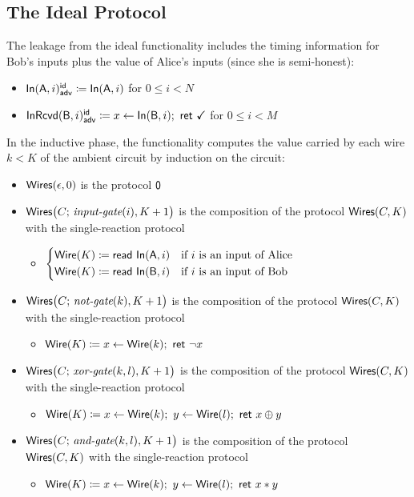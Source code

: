 \subsection{The Ideal Protocol}
The leakage from the ideal functionality includes the timing information for Bob's inputs plus the value of Alice's inputs (since she is semi-honest):
\begin{itemize}
\item {\color{blue} $\mathsf{In}(\mathsf{A},i)^{\mathsf{id}}_{\mathsf{adv}} \coloneqq \mathsf{In}(\mathsf{A},i)$ for $0 \leq i < N$}
\item {\color{blue} $\mathsf{InRcvd}(\mathsf{B},i)^{\mathsf{id}}_{\mathsf{adv}} \coloneqq x\leftarrow \mathsf{In}(\mathsf{B},i); \ \mathsf{ret} \ \checkmark$ for $0 \leq i < M$}
\end{itemize}

\noindent In the inductive phase, the functionality computes the value carried by each wire $k < K$ of the ambient circuit by induction on the circuit:

\begin{itemize}
\item $\mathsf{Wires}(\epsilon,0)$ is the protocol $\mathsf{0}$
\item $\mathsf{Wires}\big(C; \, \textit{input-gate}(i),K+1\big)$ is the composition of the protocol $\mathsf{Wires}(C,K)$ with the single-reaction protocol
\begin{itemize}
\item $\begin{cases*} \Wire(K) \coloneqq \read{\In(\A,i)} & \text{if $i$ is an input of Alice} \\ \Wire(K) \coloneqq \read{\In(\B,i)} & \text{if $i$ is an input of Bob} \end{cases*}$
\end{itemize}
\item $\mathsf{Wires}\big(C; \, \textit{not-gate}(k),K+1\big)$ is the composition of the protocol $\mathsf{Wires}(C,K)$ with the single-reaction protocol
\begin{itemize}
\item $\mathsf{Wire}(K) \coloneqq x \leftarrow \mathsf{Wire}(k); \ \mathsf{ret} \ \neg x$
\end{itemize}
\item $\mathsf{Wires}\big(C; \, \textit{xor-gate}(k,l),K+1\big)$ is the composition of the protocol $\mathsf{Wires}(C,K)$ with the single-reaction protocol
\begin{itemize}
\item $\mathsf{Wire}(K) \coloneqq x \leftarrow \mathsf{Wire}(k); \ y \leftarrow \mathsf{Wire}(l); \ \mathsf{ret} \ x \oplus y$
\end{itemize}
\item $\mathsf{Wires}\big(C; \, \textit{and-gate}(k,l),K+1\big)$ is the composition of the protocol $\mathsf{Wires}(C,K)$ with the single-reaction protocol
\begin{itemize}
\item $\mathsf{Wire}(K) \coloneqq x \leftarrow \mathsf{Wire}(k); \ y \leftarrow \mathsf{Wire}(l); \ \mathsf{ret} \ x * y$
\end{itemize}
\end{itemize}

